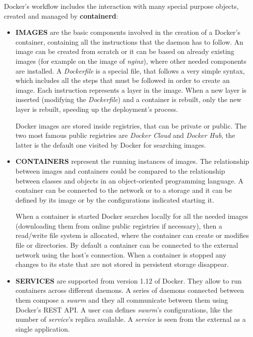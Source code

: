 \documentclass[a4paper,12pt]{article}
\begin{document}
Docker's workflow includes the interaction with many special purpose objects,
created and managed by \textbf{containerd}:
\begin{itemize}
  \item \textbf{IMAGES} are the basic components involved in the creation of a
  Docker's container, containing all the instructions that the daemon has to
  follow. An image can be created from scratch or it can be based on already
  existing images (for example on the image of \textit{nginx}), where other
  needed components are installed. A \textit{Dockerfile} is a special file, that
  follows a very simple syntax, which includes all the steps that must be
  followed in order to create an image. Each instruction represents a layer in
  the image. When a new layer is inserted (modifying the \textit{Dockerfile})
  and a container is rebuilt, only the new layer is rebuilt, speeding up the
  deployment's process.\par Docker images are stored inside registries, that can
  be private or public. The two most famous public registries are \textit{Docker
  Cloud} and \textit{Docker Hub}, the latter is the default one visited by
  Docker for searching images.   
  \item \textbf{CONTAINERS} represent the running instances of images.
  The relationship between images and containers could be compared to the
  relationship between classes and objects in an object-oriented programming
  language. A container can be connected to the network or to a storage and it
  can be defined by its image or by the configurations indicated starting
  it.\par When a container is started Docker searches locally for all the needed
  images (downloading them from online public registries if necessary), then a
  read/write file system is allocated, where the container can create or modifies
  file or directories. By default a container can be connected to the external
  network using the host's connection. When a container is stopped  any changes
  to its state that are not stored in persistent storage disappear.
  \item \textbf{SERVICES} are supported from version 1.12 of Docker. They allow
  to run containers across different daemons. A series of daemons connected
  between them compose a \textit{swarm} and they all communicate between them
  using Docker's REST API. A user can defines \textit{swarm}'s configurations,
  like the number of \textit{service}'s replica available. A \textit{service} is
  seen from the external as a single application.\cite{docker_objects}
\end{itemize}
\end{document}
